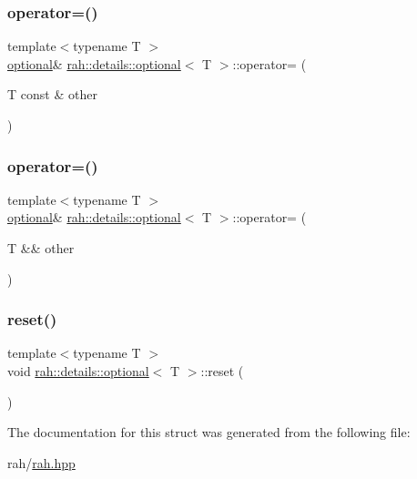 \subsubsection{\texorpdfstring{operator=()}{operator=()}\hspace{0.1cm}{\footnotesize\ttfamily [3/4]}}
{\footnotesize\ttfamily template$<$typename T $>$ \\
\mbox{\hyperlink{structrah_1_1details_1_1optional}{optional}}\& \mbox{\hyperlink{structrah_1_1details_1_1optional}{rah\+::details\+::optional}}$<$ T $>$\+::operator= (\begin{DoxyParamCaption}\item[{T const \&}]{other }\end{DoxyParamCaption})\hspace{0.3cm}{\ttfamily [inline]}}

\mbox{\label{structrah_1_1details_1_1optional_aa9405bb93c88cf4dbcfae1c69d988a6d}} 
\subsubsection{\texorpdfstring{operator=()}{operator=()}\hspace{0.1cm}{\footnotesize\ttfamily [4/4]}}
{\footnotesize\ttfamily template$<$typename T $>$ \\
\mbox{\hyperlink{structrah_1_1details_1_1optional}{optional}}\& \mbox{\hyperlink{structrah_1_1details_1_1optional}{rah\+::details\+::optional}}$<$ T $>$\+::operator= (\begin{DoxyParamCaption}\item[{T \&\&}]{other }\end{DoxyParamCaption})\hspace{0.3cm}{\ttfamily [inline]}}

\mbox{\label{structrah_1_1details_1_1optional_ab0d982081783ade3caa9eb1150d9936b}} 
\subsubsection{\texorpdfstring{reset()}{reset()}}
{\footnotesize\ttfamily template$<$typename T $>$ \\
void \mbox{\hyperlink{structrah_1_1details_1_1optional}{rah\+::details\+::optional}}$<$ T $>$\+::reset (\begin{DoxyParamCaption}{ }\end{DoxyParamCaption})\hspace{0.3cm}{\ttfamily [inline]}}



The documentation for this struct was generated from the following file\+:\begin{DoxyCompactItemize}
\item 
rah/\mbox{\hyperlink{rah_8hpp}{rah.\+hpp}}\end{DoxyCompactItemize}
